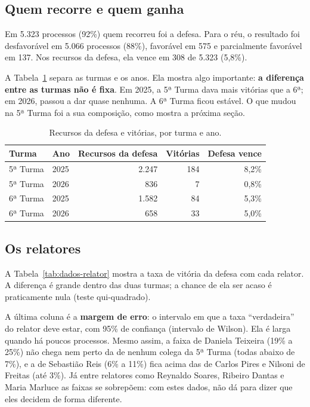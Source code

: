 \subsection*{Quem recorre e quem ganha}

Em 5.323 processos (92\%) quem recorreu foi a defesa. Para o réu, o resultado foi
desfavorável em 5.066 processos (88\%), favorável em 575 e parcialmente favorável em 137.
Nos recursos da defesa, ela vence em 308 de 5.323 (5,8\%).

A Tabela~\ref{tab:dados-turma} separa as turmas e os anos. Ela mostra algo importante:
\textbf{a diferença entre as turmas não é fixa}. Em 2025, a 5ª Turma dava mais vitórias que
a 6ª; em 2026, passou a dar quase nenhuma. A 6ª Turma ficou estável. O que mudou na 5ª Turma
foi a sua composição, como mostra a próxima seção.

\begin{table}[h]
\centering\small
\caption{Recursos da defesa e vitórias, por turma e ano.}
\label{tab:dados-turma}
\begin{tabular}{llrrr}
\toprule
Turma & Ano & Recursos da defesa & Vitórias & Defesa vence \\
\midrule
5ª Turma & 2025 & 2.247 & 184 & 8,2\% \\
5ª Turma & 2026 & 836 & 7 & 0,8\% \\
6ª Turma & 2025 & 1.582 & 84 & 5,3\% \\
6ª Turma & 2026 & 658 & 33 & 5,0\% \\
\bottomrule
\end{tabular}
\end{table}

\subsection*{Os relatores}

A Tabela~\ref{tab:dados-relator} mostra a taxa de vitória da defesa com cada relator. A
diferença é grande dentro das duas turmas; a chance de ela ser acaso é praticamente nula
(teste qui-quadrado).

A última coluna é a \textbf{margem de erro}: o intervalo em que a taxa ``verdadeira'' do
relator deve estar, com 95\% de confiança (intervalo de Wilson). Ela é larga quando há poucos
processos. Mesmo assim, a faixa de Daniela Teixeira (19\% a 25\%) não chega nem perto da de
nenhum colega da 5ª Turma (todas abaixo de 7\%), e a de Sebastião Reis (6\% a 11\%) fica acima
das de Carlos Pires e Nilsoni de Freitas (até 3\%). Já entre relatores como Reynaldo Soares,
Ribeiro Dantas e Maria Marluce as faixas se sobrepõem: com estes dados, não dá para dizer que
eles decidem de forma diferente.

